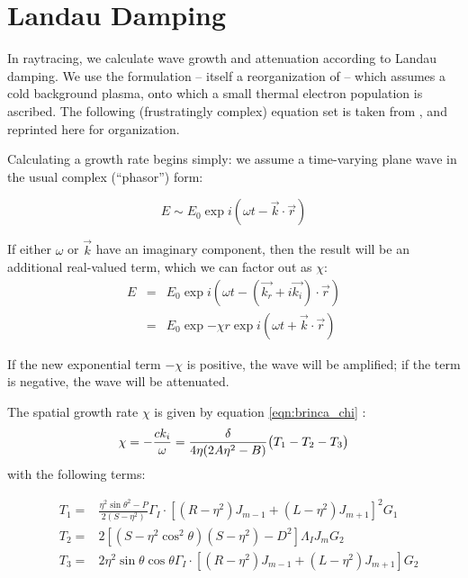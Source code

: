 \section{Landau Damping}
\label{appendix:landau}

In raytracing, we calculate wave growth and attenuation according to Landau damping. We use the \citet{Brinca1972} formulation -- itself a reorganization of \cite{Kennel1966} -- which assumes a cold background plasma, onto which a small thermal electron population is ascribed. The following (frustratingly complex) equation set is taken from \cite{Brinca1972}, and reprinted here for organization.

Calculating a growth rate begins simply: we assume a time-varying plane wave in the usual complex (``phasor'') form:

\begin{equation}
E \sim E_0 \exp{i(\omega t - \vec{k}\cdot\vec{r})}
\end{equation}

If either $\omega$ or $\vec{k}$ have an imaginary component, then the result will be an additional real-valued term, which we can factor out as $\chi$:
\begin{eqnarray}
E & = &E_0 \exp{i( \omega t - (\vec{k_r} + i\vec{k_i})\cdot\vec{r})} \\
& = &E_0 \exp{-\chi r}\exp{i(\omega t + \vec{k}\cdot\vec{r})}
\end{eqnarray}

If the new exponential term $-\chi$ is positive, the wave will be amplified; if the term is negative, the wave will be attenuated.

The spatial growth rate $\chi$ is given by equation \ref{eqn:brinca_chi} \citep{Brinca1972,Kennel1966}:
\begin{equation}
\chi = -\frac{c k_i}{\omega} = \frac{\delta}{4 \eta (2 A \eta^2 - B)} \big( T_1 - T_2 - T_3 \big) \\ \label{eqn:brinca_chi} 
\end{equation}
with the following terms:

\begin{eqnarray}
&T_1 = & \frac{\eta^2\sin{\theta}^2 - P}{2(S - \eta^2)}\Gamma_I \cdot [(R - \eta^2)J_{m-1} + (L - \eta^2)J_{m+1}]^2 G_1 \\ \nonumber
&T_2 = & 2[(S - \eta^2 \cos^2\theta)(S - \eta^2) - D^2] \Lambda_I J_m G_2 \\ \nonumber
&T_3 = & 2\eta^2 \sin \theta \cos \theta \Gamma_I\cdot [(R - \eta^2)J_{m-1} + (L - \eta^2)J_{m+1}]G_2 \\ \nonumber
\end{eqnarray}

